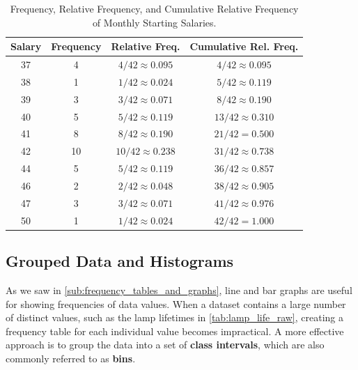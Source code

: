 \begin{table}[h!]
\centering
\renewcommand{\arraystretch}{1.3}
{
\begin{tabular}{cccc}
\toprule
\textbf{Salary} & \textbf{Frequency} & \textbf{Relative Freq.} & \textbf{Cumulative Rel. Freq.} \\
\midrule
37 & 4 & $4/42 \approx 0.095$ & $4/42 \approx 0.095$ \\
38 & 1 & $1/42 \approx 0.024$ & $5/42 \approx 0.119$ \\
39 & 3 & $3/42 \approx 0.071$ & $8/42 \approx 0.190$ \\
40 & 5 & $5/42 \approx 0.119$ & $13/42 \approx 0.310$ \\
41 & 8 & $8/42 \approx 0.190$ & $21/42 = 0.500$ \\
42 & 10 & $10/42 \approx 0.238$ & $31/42 \approx 0.738$ \\
44 & 5 & $5/42 \approx 0.119$ & $36/42 \approx 0.857$ \\
46 & 2 & $2/42 \approx 0.048$ & $38/42 \approx 0.905$ \\
47 & 3 & $3/42 \approx 0.071$ & $41/42 \approx 0.976$ \\
50 & 1 & $1/42 \approx 0.024$ & $42/42 = 1.000$ \\
\bottomrule
\end{tabular}
}
\caption{Frequency, Relative Frequency, and Cumulative Relative Frequency of Monthly Starting Salaries.}
\label{tab:salary_full_freq}
\end{table}

\subsection*{Grouped Data and Histograms}

As we saw in \autoref{sub:frequency_tables_and_graphs}, line and bar graphs are useful for showing frequencies of data values. When a dataset contains a large number of distinct values, such as the lamp lifetimes in \autoref{tab:lamp_life_raw}, creating a frequency table for each individual value becomes impractical. A more effective approach is to group the data into a set of \textbf{class intervals}, which are also commonly referred to as \textbf{bins}.

